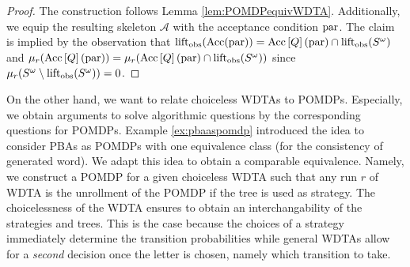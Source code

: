 \begin{proof}
  The construction follows Lemma \ref{lem:POMDPequivWDTA}. Additionally, we
  equip the resulting skeleton $\mathcal{A}$ with the acceptance condition
  $\operatorname{par}$. The claim is implied by the observation that
  $\operatorname{lift}_{\operatorname{obs}}(\operatorname{Acc}(\operatorname{par}))
  = \operatorname{Acc}\left[Q\right](\operatorname{par})\cap\operatorname{lift}_{\operatorname{obs}}(S^{\omega})$ and
  $\mu_{r}(\operatorname{Acc}\left[Q\right](\operatorname{par})) =
  \mu_{r}(\operatorname{Acc}\left[Q\right](\operatorname{par})\cap\operatorname{lift}_{\operatorname{obs}}(S^{\omega}))$ since
  $\mu_{r}(S^{\omega}\setminus\operatorname{lift}_{\operatorname{obs}}(S^{\omega})) = 0$.
\end{proof}

On the other hand, we want to relate choiceless \acp{WDTA} to \acp{POMDP}.
Especially, we obtain arguments to solve algorithmic questions by the
corresponding questions for \acp{POMDP}. Example \ref{ex:pbaaspomdp} introduced
the idea to consider \acp{PBA} as \acp{POMDP} with one equivalence class (for
the consistency of generated word). We adapt this idea to obtain a comparable
equivalence. Namely, we construct a \ac{POMDP} for a given choiceless \ac{WDTA}
such that any run $r$ of \ac{WDTA} is the unrollment of the \ac{POMDP} if the
tree is used as strategy. The choicelessness of the \ac{WDTA} ensures to obtain
an interchangability of the strategies and trees. This is the case because the
choices of a strategy immediately determine the transition probabilities while
general \acp{WDTA} allow for a \emph{second} decision once the letter is
chosen, namely which transition to take.

